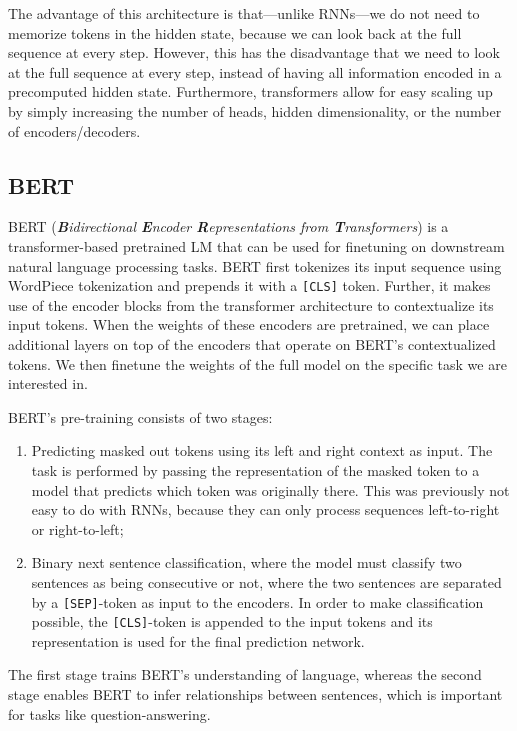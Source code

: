 The advantage of this architecture is that---unlike RNNs---we do not need to memorize tokens in the
hidden state, because we can look back at the full sequence at every step. However, this has the
disadvantage that we need to look at the full sequence at every step, instead of having all
information encoded in a precomputed hidden state. Furthermore, transformers allow for easy scaling
up by simply increasing the number of heads, hidden dimensionality, or the number of
encoders/decoders.

\subsection{BERT}

BERT (\textit{\textbf{B}idirectional \textbf{E}ncoder \textbf{R}epresentations from
    \textbf{T}ransformers}) \citep{devlin2018bert} is a transformer-based pretrained LM that can be
used for finetuning on downstream natural language processing tasks. BERT first tokenizes its input
sequence using WordPiece tokenization \citep{wu2016google} and prepends it with a \texttt{[CLS]}
token. Further, it makes use of the encoder blocks from the transformer architecture to
contextualize its input tokens. When the weights of these encoders are pretrained, we can place
additional layers on top of the encoders that operate on BERT's contextualized tokens. We then
finetune the weights of the full model on the specific task we are interested in.

BERT's pre-training consists of two stages:
\begin{enumerate}
    \item Predicting masked out tokens using its left and right context as input. The task is
          performed by passing the representation of the masked token to a model that predicts which token
          was originally there. This was previously not easy to do with RNNs, because they can only process
          sequences left-to-right or right-to-left;
    \item Binary next sentence classification, where the model must classify two sentences as being
          consecutive or not, where the two sentences are separated by a \texttt{[SEP]}-token as input to the
          encoders. In order to make classification possible, the \texttt{[CLS]}-token is appended to the
          input tokens and its representation is used for the final prediction network.
\end{enumerate}
The first stage trains BERT's understanding of language, whereas the second stage enables BERT to infer relationships
between sentences, which is important for tasks like question-answering.

